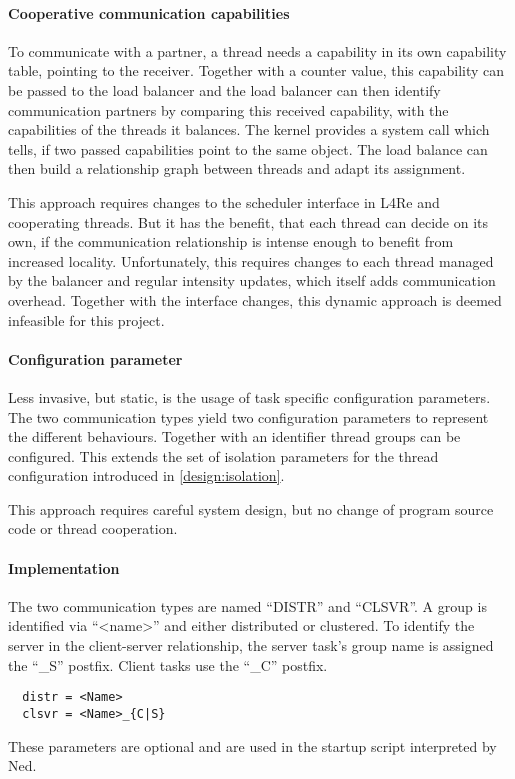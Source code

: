 \paragraph{Cooperative communication capabilities}
To communicate with a partner, a thread needs a capability in its own
capability table, pointing to the receiver.
Together with a counter value, this capability can be passed to the load
balancer and the load balancer can then identify communication partners
by comparing this received capability, with the capabilities of the threads
it balances.
The kernel provides a system call which tells, if two passed capabilities point
to the same object.
The load balance can then build a relationship graph between threads and adapt
its assignment.

This approach requires changes to the scheduler interface in L4Re and
cooperating threads.
But it has the benefit, that each thread can decide on its own, if the
communication relationship is intense enough to benefit from increased
locality.
Unfortunately, this requires changes to each thread managed by the balancer and
regular intensity updates, which itself adds communication overhead.
Together with the interface changes, this dynamic approach is deemed infeasible
for this project.

\paragraph{Configuration parameter}
Less invasive, but static, is the usage of task specific configuration parameters.
The two communication types yield two configuration parameters to represent the
different behaviours.
Together with an identifier thread groups can be configured.
This extends the set of isolation parameters for the thread configuration
introduced in \ref{design:isolation}.

This approach requires careful system design, but no change of program source
code or thread cooperation.

\paragraph{Implementation}
The two communication types are named ``DISTR'' and ``CLSVR''.
A group is identified via ``<name>'' and either distributed or clustered.
To identify the server in the client-server relationship, the server task's
group name is assigned the ``\_S'' postfix.
Client tasks use the ``\_C'' postfix.

\begin{lstlisting}
  distr = <Name>
  clsvr = <Name>_{C|S}
\end{lstlisting}

These parameters are optional and are used in the startup script interpreted by
Ned.
